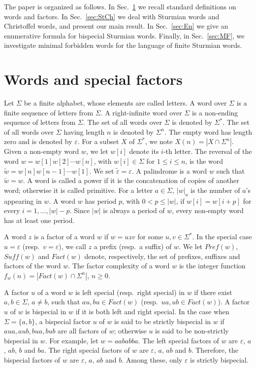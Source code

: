 \documentclass{llncs}
\newcommand{\Suff}{\textit{Suff}}
\newcommand{\Pref}{\textit{Pref}}
\newcommand{\Fact}{\textit{Fact}}
\renewcommand{\epsilon}{\varepsilon}
\begin{document}
The paper is organized as follows. In Sec.\ \ref{sec:wsf} we recall standard definitions on words and factors. In Sec.\ \ref{sec:StCh} we deal with Sturmian words and Christoffel words, and present our main result. In Sec.\ \ref{sec:En} we give an enumerative formula for bispecial Sturmian words. Finally, in Sec.\ \ref{sec:MF}, we investigate minimal forbidden words for the language of finite Sturmian words. 

\section{Words and special factors}\label{sec:wsf}


Let $\Sigma$ be a finite alphabet, whose elements are called letters. A word over $\Sigma$ is a finite sequence of letters from $\Sigma$. A right-infinite word over $\Sigma$ is a non-ending sequence of letters from $\Sigma$. The set of all words over $\Sigma$ is denoted by $\Sigma^*$. The set of all words over $\Sigma$ having length $n$ is denoted by $\Sigma^n$. The empty word has length zero and is denoted by $\varepsilon$. For a subset $X$ of $\Sigma^{*}$, we note $X(n)=|X\cap \Sigma^{n}|$. Given a non-empty word $w$, we let $w[i]$ denote its $i$-th letter. The reversal of the word $w=w[1]w[2]\cdots w[n]$, with $w[i]\in\Sigma$ for $1\leq i\leq n$, is the word $\tilde{w}=w[n]w[n-1]\cdots w[1]$. We set $\tilde{\epsilon}=\epsilon$. A palindrome is a word $w$ such that $\tilde{w}=w$. A word is called a power if it is the concatenation of copies of another word; otherwise it is called primitive. For a letter $a\in \Sigma$, $|w|_{a}$ is the number of $a$'s appearing in $w$.  A word $w$ has period $p$, with $0<p\leq |w|$, if $w[i]=w[i+p]$ for every $i=1,\ldots ,|w|-p$. Since $|w|$ is always a period of $w$, every non-empty word has at least one period. 

A word $z$ is a factor of a word $w$ if $w=uzv$ for some $u,v\in \Sigma^{*}$. In the special case $u = \varepsilon $ (resp.~$v = \varepsilon $), we call $z$ a prefix (resp.~a suffix) of $w$. We let $\Pref(w)$, $\Suff(w)$ and $\Fact(w)$ denote, respectively, the set of prefixes, suffixes and factors of the word $w$. The factor complexity of a word $w$ is the integer function $f_{w}(n)=|\Fact(w)\cap \Sigma^n|$,  $n\geq 0$. 

A factor $u$ of a word $w$ is left special (resp.~right special) in $w$ if there exist $a,b\in \Sigma$, $a\neq b$, such that $au,bu\in \Fact(w)$ (resp.~$ua,ub\in \Fact(w)$). A factor $u$ of $w$ is bispecial in $w$ if it is both left and right special. In the case when $\Sigma=\{a,b\}$, a bispecial factor $u$ of $w$ is said to be strictly bispecial in $w$ if $aua,aub,bua,bub$ are all factors of $w$; otherwise $u$ is said to be non-strictly bispecial in $w$. For example, let $w= aababba$. The left special factors of $w$ are $\epsilon$, $a$, $ab$, $b$ and $ba$. The right special factors of $w$ are $\epsilon$, $a$, $ab$ and $b$. Therefore, the bispecial factors of $w$ are $\epsilon$, $a$, $ab$ and $b$. Among these, only $\epsilon$ is strictly bispecial.
\end{document}
